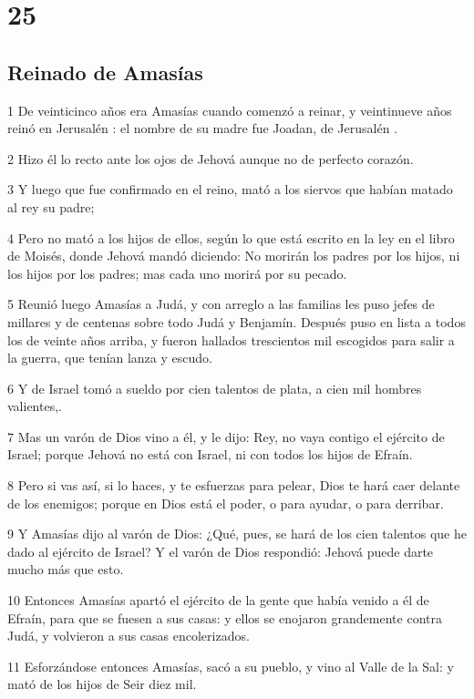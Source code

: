 \chapter{25}

\section*{Reinado de Amasías}

\par 1 De veinticinco años era Amasías cuando comenzó a reinar, y veintinueve años reinó en Jerusalén : el nombre de su madre fue Joadan, de Jerusalén .
\par 2 Hizo él lo recto ante los ojos de Jehová aunque no de perfecto corazón.
\par 3 Y luego que fue confirmado en el reino, mató a los siervos que habían matado al rey su padre;
\par 4 Pero no mató a los hijos de ellos,  según lo que está escrito en la ley en el libro de Moisés, donde Jehová mandó diciendo: No morirán los padres por los hijos, ni los hijos por los padres; mas cada uno morirá por su pecado. 
\par 5 Reunió luego Amasías a Judá, y con arreglo a las familias les puso jefes de millares y de centenas sobre todo Judá y Benjamín. Después puso en lista a todos los de veinte años arriba, y fueron hallados trescientos mil escogidos para salir a la guerra, que tenían lanza y escudo.
\par 6 Y de Israel tomó a sueldo por cien talentos de plata,   a cien mil hombres valientes,.
\par 7 Mas un varón de Dios vino a él, y le dijo: Rey, no vaya contigo el ejército de Israel; porque Jehová no está con Israel, ni con todos los hijos de Efraín.
\par 8 Pero si vas así, si lo haces, y te esfuerzas para pelear, Dios te hará caer delante de los enemigos; porque en Dios está el poder, o para ayudar, o para derribar.
\par 9 Y Amasías dijo al varón de Dios: ¿Qué, pues, se hará de los cien talentos   que he dado al ejército de Israel? Y el varón de Dios respondió: Jehová puede darte mucho más que esto.
\par 10 Entonces Amasías apartó el ejército de la gente que había venido a él de Efraín, para que se fuesen a sus casas: y ellos se enojaron grandemente contra Judá, y volvieron a sus casas encolerizados.
\par 11 Esforzándose entonces Amasías, sacó a su pueblo, y vino al Valle de la Sal: y mató de los hijos de Seir diez mil. 
